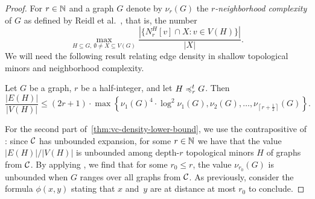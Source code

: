 \begin{proof}
For $r\in \mathbb{N}$ and a graph $G$ denote by $\nu_r(G)$ the
\emph{$r$-neighborhood complexity} of $G$ as defined
by Reidl et al.~\cite{reidl2016characterising}, that is, the number 
\[\max_{H\subseteq G,\,\emptyset\neq X\subseteq V(G)}\frac{|\{N_r^H[v]\cap X : v\in V(H)\}|}{|X|}.\] 
We will need the following result relating edge density in shallow topological minors and neighborhood complexity.

\begin{lemma}\label{lem:lower-be}
Let $G$ be a graph, $r$ be a half-integer, 
and let $H\preccurlyeq_r^tG$. 
Then 
$$\frac{|E(H)|}{|V(H)|}\leq (2r + 1)\cdot \max \left\{\nu_1(G)^4\cdot \log^2\nu_1(G),\nu_2(G),\ldots, \nu_{\left\lceil r+\frac{1}{2}\right\rceil}(G)\right\}.$$
\end{lemma}




For the second part of~\cref{thm:vc-density-lower-bound}, we use the contrapositive of : since $\mathcal{C}$ has unbounded expansion, for some $r\in \mathbb{N}$ 
we have that the value $|E(H)|/|V(H)|$ is unbounded among depth-$r$ topological minors $H$ of graphs from $\mathcal{C}$.
By applying , we find that for some $r_0\leq r$, the value
$\nu_{r_0}(G)$ is unbounded when $G$ ranges over all graphs from $\mathcal{C}$. 
As previously, consider the formula $\phi(x,y)$ stating that $x$ and~$y$ are at distance at most $r_0$ to conclude. 
 \end{proof}

